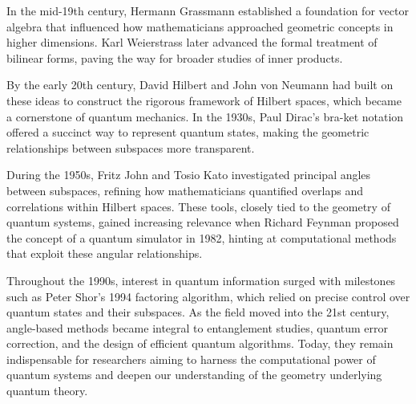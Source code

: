 \begin{historical}
In the mid-19th century, Hermann Grassmann established a foundation for vector algebra that influenced how mathematicians approached geometric concepts in higher dimensions. Karl Weierstrass later advanced the formal treatment of bilinear forms, paving the way for broader studies of inner products.

By the early 20th century, David Hilbert and John von Neumann had built on these ideas to construct the rigorous framework of Hilbert spaces, which became a cornerstone of quantum mechanics. In the 1930s, Paul Dirac’s bra-ket notation offered a succinct way to represent quantum states, making the geometric relationships between subspaces more transparent.

During the 1950s, Fritz John and Tosio Kato investigated principal angles between subspaces, refining how mathematicians quantified overlaps and correlations within Hilbert spaces. These tools, closely tied to the geometry of quantum systems, gained increasing relevance when Richard Feynman proposed the concept of a quantum simulator in 1982, hinting at computational methods that exploit these angular relationships.

Throughout the 1990s, interest in quantum information surged with milestones such as Peter Shor’s 1994 factoring algorithm, which relied on precise control over quantum states and their subspaces. As the field moved into the 21st century, angle-based methods became integral to entanglement studies, quantum error correction, and the design of efficient quantum algorithms. Today, they remain indispensable for researchers aiming to harness the computational power of quantum systems and deepen our understanding of the geometry underlying quantum theory.
\end{historical}